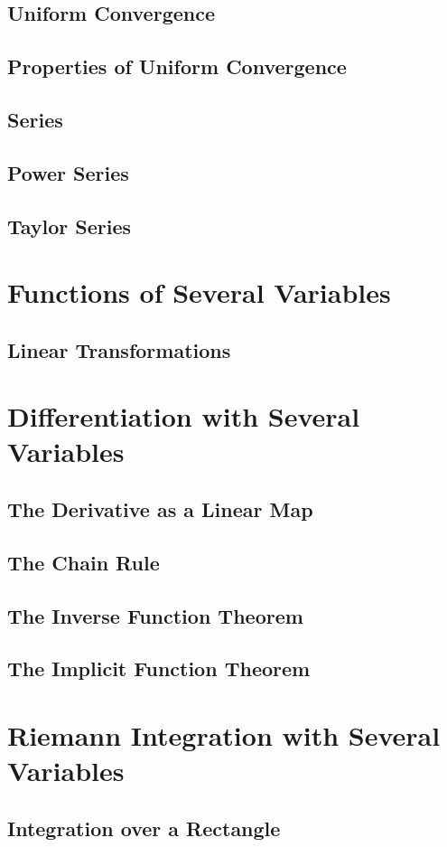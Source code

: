 \documentclass{article}
\theoremstyle{definition}
\begin{document}
\subsection{Uniform Convergence}
\subsection{Properties of Uniform Convergence}
\subsection{Series}
\subsection{Power Series}
\subsection{Taylor Series}
\section{Functions of Several Variables}
\subsection{Linear Transformations}
\section{Differentiation with Several Variables}
\subsection{The Derivative as a Linear Map}
\subsection{The Chain Rule}
\subsection{The Inverse Function Theorem}
\subsection{The Implicit Function Theorem}
\section{Riemann Integration with Several Variables}
\subsection{Integration over a Rectangle}
\end{document}

